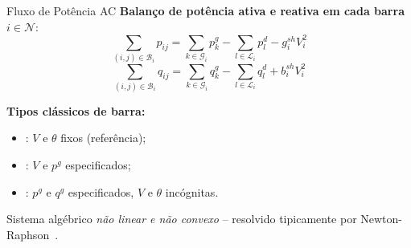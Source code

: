 \documentclass{libs/ufc_format}
\begin{document}
\begin{frame}{Fluxo de Potência AC}
    \textbf{Balanço de potência ativa e reativa em cada barra} $i \in \mathcal{N}$:
    \begin{equation*}
        \sum_{(i,j) \in \mathcal{B}_i} p_{ij} = \sum_{k \in \mathcal{G}_i} p^g_k - \sum_{l \in \mathcal{L}_i} p^d_l - g^{sh}_i V_i^2
    \end{equation*}
    \begin{equation*}
        \sum_{(i,j) \in \mathcal{B}_i} q_{ij} = \sum_{k \in \mathcal{G}_i} q^g_k - \sum_{l \in \mathcal{L}_i} q^d_l + b^{sh}_i V_i^2
    \end{equation*}

    \vspace{0.2cm}
    \textbf{Tipos clássicos de barra:}
    \begin{itemize}
        \item {}: $V$ e $\theta$ fixos (referência);
        \item {}: $V$ e $p^g$ especificados;
        \item {}: $p^g$ e $q^g$ especificados, $V$ e $\theta$ incógnitas.
    \end{itemize}

    \vspace{0.2cm}
    Sistema algébrico \emph{não linear e não convexo} -- resolvido tipicamente por Newton-Raphson~\cite{vonMeier2006powersystems,gloverSarma2012power}.
\end{frame}
\end{document}
